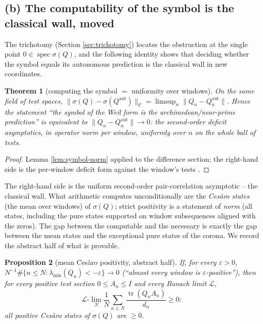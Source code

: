 \documentclass[11pt,reqno]{amsart}
\newtheorem{theorem}{Theorem}[section]
\newtheorem{proposition}[theorem]{Proposition}
\theoremstyle{definition}
\newcommand{\Cor}{\mathcal{C}}
\newcommand{\spec}{\operatorname{spec}}
\newcommand{\tr}{\operatorname{tr}}
\newcommand{\Qaut}{Q^{\mathrm{aut}}}
\begin{document}
\subsection{(b) The computability of the symbol is the classical wall, moved}
The trichotomy (Section \ref{sec:trichotomy}) locates the obstruction at the
single point \(0\in\spec\sigma(Q)\), and the following identity shows that
deciding whether the symbol equals its autonomous prediction is the classical
wall in new coordinates.

\begin{theorem}[computing the symbol \(=\) uniformity over windows]
\label{thm:symbolcompute}
On the same field of test spaces,
\(\|\sigma(Q)-\sigma(\Qaut)\|_{\Cor}=\limsup_n\|Q_n-\Qaut_n\|\). Hence the
statement ``the symbol of the Weil form is the archimedean/near-prime
prediction'' is equivalent to \(\|Q_n-\Qaut_n\|\to0\): the second-order
deficit asymptotics, in operator norm per window, \emph{uniformly} over \(n\) on
the whole ball of tests.
\end{theorem}

\begin{proof}
Lemma \ref{lem:symbol-norm} applied to the difference section; the right-hand
side is the per-window deficit form against the window's tests
\cite{P40}.
\end{proof}

The right-hand side is the uniform second-order pair-correlation asymptotic --
the classical wall. What arithmetic computes unconditionally are the
\emph{Ces\`aro states} (the mean over windows) of \(\sigma(Q)\); strict
positivity is a statement of \emph{norm} (all states, including the pure states
supported on window subsequences aligned with the zeros). The gap between the
computable and the necessary is exactly the gap between the mean states and the
exceptional pure states of the corona. We record the abstract half of what is
provable.

\begin{proposition}[mean Ces\`aro positivity, abstract half]\label{prop:cesaro}
If, for every \(\varepsilon>0\),
\(N^{-1}\#\{n\leq N:\lambda_{\min}(Q_n)<-\varepsilon\}\to0\) (``almost every
window is \(\varepsilon\)-positive''), then for every positive test section
\(0\leq A_n\leq I\) and every Banach limit \(\mathcal L\),
\[
\mathcal L\text{-}\lim_N\frac1N\sum_{n\leq N}\frac{\tr(Q_nA_n)}{d_n}\geq0:
\]
all positive Ces\`aro states of \(\sigma(Q)\) are \(\geq0\).
\end{proposition}
\end{document}
